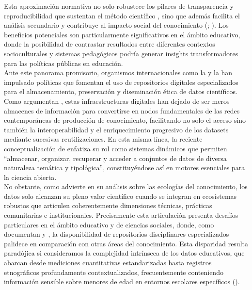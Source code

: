 \documentclass[runningheads]{llncs}
\begin{document}
Esta aproximación normativa no solo robustece los pilares de transparencia y reproducibilidad que sustentan el método científico \cite{oecd2020}, sino que además facilita el análisis secundario y contribuye al impacto social del conocimiento (\cite{ec2016}; \cite{wilkinson2016}). Los beneficios potenciales son particularmente significativos en el ámbito educativo, donde la posibilidad de contrastar resultados entre diferentes contextos socioculturales y sistemas pedagógicos podría generar insights transformadores para las políticas públicas en educación.\\

Ante este panorama promisorio, organismos internacionales como la \cite{unesco2021} y la \cite{oecd2020} han impulsado políticas que fomentan el uso de repositorios digitales especializados para el almacenamiento, preservación y diseminación ética de datos científicos. Como argumentan \cite{borgman2018}, estas infraestructuras digitales han dejado de ser meros almacenes de información para convertirse en nodos fundamentales de las redes contemporáneas de producción de conocimiento, facilitando no solo el acceso sino también la interoperabilidad y el enriquecimiento progresivo de los datasets mediante sucesivas reutilizaciones. En esta misma línea, la reciente conceptualización de \cite[p.~27]{avila2024} enfatiza su rol como sistemas dinámicos que permiten ``almacenar, organizar, recuperar y acceder a conjuntos de datos de diversa naturaleza temática y tipológica'', constituyéndose así en motores esenciales para la ciencia abierta.\\

No obstante, como advierte \cite{borgman2016} en su análisis sobre las ecologías del conocimiento, los datos solo alcanzan su pleno valor científico cuando se integran en ecosistemas robustos que articulen coherentemente dimensiones técnicas, prácticas comunitarias e institucionales. Precisamente esta articulación presenta desafíos particulares en el ámbito educativo y de ciencias sociales, donde, como documentan \cite{kraehmer2023} y \cite{Lamb2024}, la disponibilidad de repositorios disciplinares especializados palidece en comparación con otras áreas del conocimiento. Esta disparidad resulta paradójica si consideramos la complejidad intrínseca de los datos educativos, que abarcan desde mediciones cuantitativas estandarizadas hasta registros etnográficos profundamente contextualizados, frecuentemente conteniendo información sensible sobre menores de edad en entornos escolares específicos (\cite{gomes2022}).\\
\end{document}
